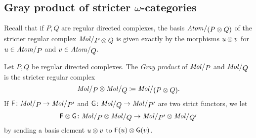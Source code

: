 \subsection{Gray product of stricter \texorpdfstring{$\omega$}{}-categories}

Recall that if \( P, Q \) are regular directed complexes, the basis \( \atomin{(P \gray Q)} \) of the stricter regular complex \( \molecin{P \gray Q} \) is given exactly by the morphisms \( u \otimes v \) for \( u \in \atomin{P} \) and \( v \in \atomin{Q} \).  

\begin{dfn}  \label{dfn:gray_product_of_stricter_regular_complexes}
    Let \( P, Q \) be regular directed complexes.
    The \emph{Gray product} of \( \molecin{P} \) and \( \molecin{Q} \) is the stricter regular complex
    \begin{equation*}
        \molecin{P} \gray \molecin{Q} \eqdef \molecin{(P \gray Q)}.
    \end{equation*}
    If \( \F \colon \molecin{P} \to \molecin{P'} \) and \( \G \colon \molecin{Q} \to \molecin{P'} \) are two strict functors, we let 
    \begin{equation*}
        \F \gray \G \colon \molecin{P} \gray \molecin{Q} \to  \molecin{P'} \gray \molecin{Q'}
    \end{equation*}
    by sending a basis element \( u \otimes v \) to \( \mathsf{F}(u) \otimes \mathsf{G}(v) \).
\end{dfn}

